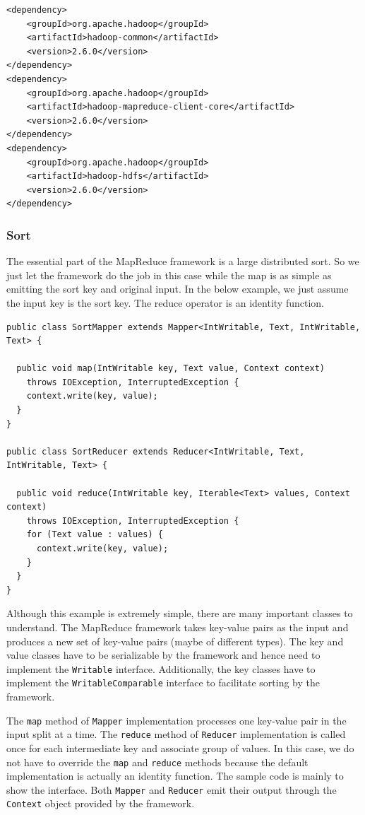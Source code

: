 \documentclass[11pt]{book}
\begin{document}
\begin{lstlisting}
<dependency>
    <groupId>org.apache.hadoop</groupId>
    <artifactId>hadoop-common</artifactId>
    <version>2.6.0</version>
</dependency>
<dependency>
    <groupId>org.apache.hadoop</groupId>
    <artifactId>hadoop-mapreduce-client-core</artifactId>
    <version>2.6.0</version>
</dependency>
<dependency>
    <groupId>org.apache.hadoop</groupId>
    <artifactId>hadoop-hdfs</artifactId>
    <version>2.6.0</version>
</dependency>
\end{lstlisting}

\subsubsection{Sort}

The essential part of the MapReduce framework is a large distributed sort. So we just let the framework do the job in this case while the map is as simple as emitting the sort key and original input. In the below example, we just assume the input key is the sort key. The reduce operator is an identity function.

\begin{lstlisting}
public class SortMapper extends Mapper<IntWritable, Text, IntWritable, Text> {

  public void map(IntWritable key, Text value, Context context)
    throws IOException, InterruptedException {
    context.write(key, value);
  }
}

public class SortReducer extends Reducer<IntWritable, Text, IntWritable, Text> {

  public void reduce(IntWritable key, Iterable<Text> values, Context context)
    throws IOException, InterruptedException {
    for (Text value : values) {
      context.write(key, value);
    }
  }
}
\end{lstlisting}

Although this example is extremely simple, there are many important classes to understand. The MapReduce framework takes key-value pairs as the input and produces a new set of key-value pairs (maybe of different types).
The key and value classes have to be serializable by the framework and hence need to implement the \texttt{Writable} interface. Additionally, the key classes have to implement the \texttt{WritableComparable} interface to facilitate sorting by the framework.

The \texttt{map} method of \texttt{Mapper} implementation processes one key-value pair in the input split at a time. The \texttt{reduce} method of \texttt{Reducer} implementation is called once for each intermediate key and associate group of values. In this case, we do not have to override the \texttt{map} and \texttt{reduce} methods because the default implementation is actually an identity function. The sample code is mainly to show the interface. Both \texttt{Mapper} and \texttt{Reducer} emit their output through the \texttt{Context} object provided by the framework.
\end{document}
